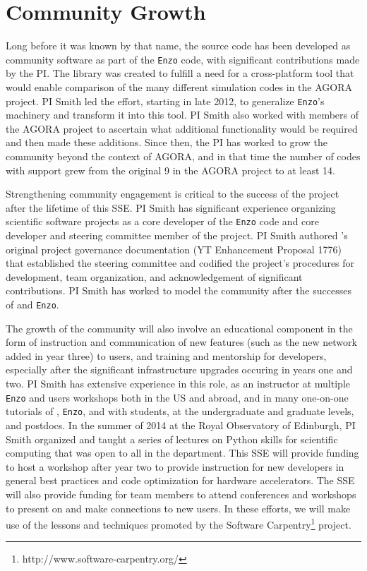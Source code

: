 \section{Community Growth}\label{sec:community_growth}

Long before it was known by that name, the \grackle{} source code has
been developed as community software as part of the \texttt{Enzo}
code, with significant contributions made by the PI.  The \grackle{}
library was created to fulfill a need
for a cross-platform tool that would enable comparison of the many
different simulation codes in the AGORA project.  PI Smith led the
effort, starting in late 2012, to generalize \texttt{Enzo}'s machinery
and transform it into this tool.  PI Smith also worked with members of
the AGORA project to ascertain what additional functionality would be
required and then made these additions.  Since then, the PI has worked
to grow the \grackle{} community beyond the context of AGORA, and in
that time the number of codes with \grackle{} support grew from the
original 9 in the AGORA project to at least 14.

Strengthening community engagement is critical to the success of the
\grackle{} project after the lifetime of this SSE.  PI Smith has
significant experience organizing scientific software projects as a
core developer of the \texttt{Enzo} code and core developer and
steering committee member of the \yt{} project.  PI Smith authored
\yt{}'s original project governance documentation (YT Enhancement
Proposal 1776) that established the steering committee and codified the
project's procedures for development, team organization, and
acknowledgement of significant contributions.  PI Smith has worked to
model the \grackle{} community after the successes of \yt{} and
\texttt{Enzo}.

The growth of the \grackle{} community will also involve an
educational component in the form of instruction and communication of
new features (such as the new network added in year three) to users,
and training and mentorship for developers, especially after the
significant infrastructure upgrades occuring in years one and two.  PI
Smith has extensive experience in this role, as an instructor at
multiple \texttt{Enzo} and \yt{} users workshops both in the US and
abroad, and in many one-on-one tutorials of \grackle{}, \texttt{Enzo},
and \yt{} with students, at the undergraduate and graduate levels, and
postdocs.  In the summer of 2014 at the Royal Observatory of
Edinburgh, PI Smith organized and taught a series of lectures on
Python skills for scientific computing that was open to all in the
department.  This SSE will provide funding to host a
workshop after year two to provide instruction for new developers in
general best practices and code optimization for hardware
accelerators.  The SSE will also provide funding for team members to
attend conferences and workshops to present on \grackle{} and make
connections to new users.  In these efforts, we will make use of the
lessons and techniques promoted by the Software
Carpentry\footnote{http://www.software-carpentry.org/} project.

